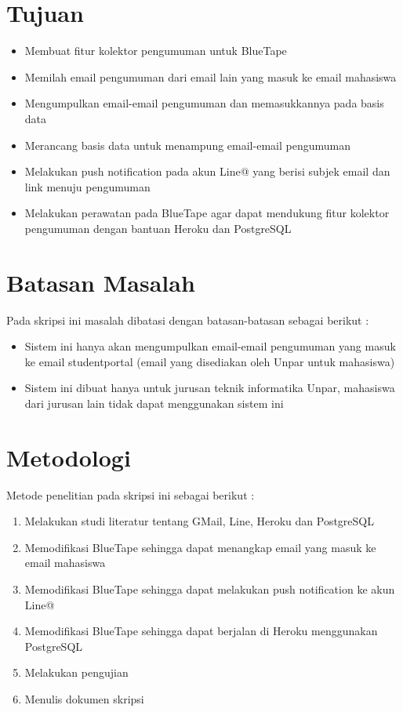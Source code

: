 \section{Tujuan}
\label{sec:tujuan}
\begin{itemize}
\item Membuat fitur kolektor pengumuman untuk BlueTape
\item Memilah email pengumuman dari email lain yang masuk ke email mahasiswa
\item Mengumpulkan email-email pengumuman dan memasukkannya pada basis data
\item Merancang basis data untuk menampung email-email pengumuman
\item Melakukan push notification pada akun Line@ yang berisi subjek email dan link menuju pengumuman
\item Melakukan perawatan pada BlueTape agar dapat mendukung fitur kolektor pengumuman dengan bantuan Heroku dan PostgreSQL
\end{itemize}

\section{Batasan Masalah}
\label{sec:batasan}
Pada skripsi ini masalah dibatasi dengan batasan-batasan sebagai berikut :
\begin{itemize}
\item Sistem ini hanya akan mengumpulkan email-email pengumuman yang masuk ke email studentportal (email yang disediakan oleh Unpar untuk mahasiswa)
\item Sistem ini dibuat hanya untuk jurusan teknik informatika Unpar, mahasiswa dari jurusan lain tidak dapat menggunakan sistem ini
\end{itemize}


\section{Metodologi}
\label{sec:metodepenelitian}
Metode penelitian pada skripsi ini sebagai berikut :
	\begin{enumerate}
		\item Melakukan studi literatur tentang GMail, Line, Heroku dan PostgreSQL
		\item Memodifikasi BlueTape sehingga dapat menangkap email yang masuk ke email mahasiswa
		\item Memodifikasi BlueTape sehingga dapat melakukan push notification ke akun Line@
		\item Memodifikasi BlueTape sehingga dapat berjalan di Heroku menggunakan PostgreSQL
		\item Melakukan pengujian
		\item Menulis dokumen skripsi
	\end{enumerate}

